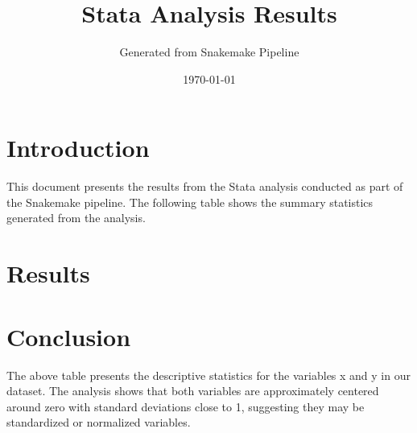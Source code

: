 \documentclass[12pt]{article}
\title{Stata Analysis Results}
\author{Generated from Snakemake Pipeline}
\date{\today}
\begin{document}
\maketitle

\section{Introduction}

This document presents the results from the Stata analysis conducted as part of the Snakemake pipeline. The following table shows the summary statistics generated from the analysis.

\section{Results}



\section{Conclusion}

The above table presents the descriptive statistics for the variables x and y in our dataset. The analysis shows that both variables are approximately centered around zero with standard deviations close to 1, suggesting they may be standardized or normalized variables.
\end{document}
